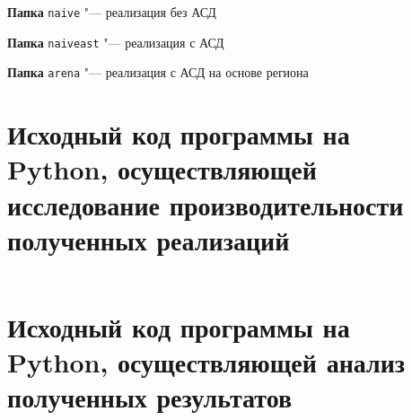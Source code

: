 \documentclass[referat]{SCWorks}
\begin{document}
\textbf{Папка} \verb|naive| "--- реализация без АСД

\textbf{Папка} \verb|naiveast|  "--- реализация с АСД

\textbf{Папка} \verb|arena| "--- реализация с АСД на основе региона


\section{Исходный код программы на Python, осуществляющей исследование
производительности полученных реализаций}
\label{app:Исследование производительности}

\inputminted[fontsize=\small, breaklines=true, style=bw, linenos]{python3}{test.py}

\section{Исходный код программы на Python, осуществляющей анализ
полученных результатов}
\label{app:Анализ результатов}

\inputminted[fontsize=\small, breaklines=true, style=bw, linenos]{python3}{graph.py}
\end{document}
